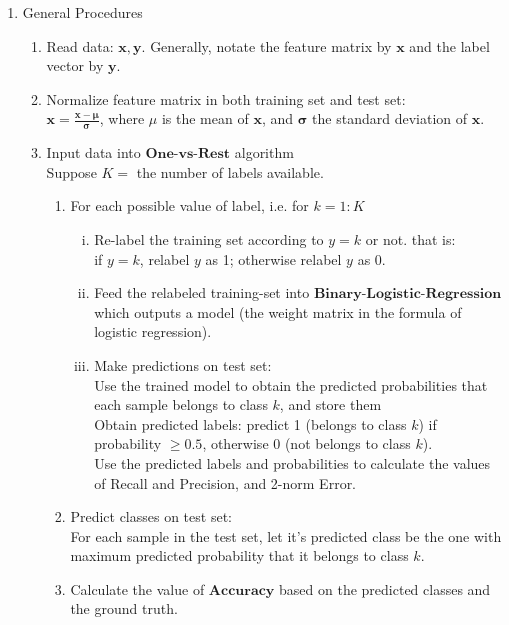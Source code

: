 \documentclass[a4paper,UTF8]{article}
\numberwithin{equation}{section}
\begin{document}
\begin{enumerate}[1.]

\item General Procedures

	\begin{enumerate}[(1)]
	\item 	Read data: $\mathbf{x, y}$. Generally, notate the feature matrix by $\mathbf{x}$  and the label vector by $\mathbf{y}$.
	\item Normalize feature matrix in both training set and test set: \\
	$\mathbf{x = \frac{x - \mu}{\sigma}}$, where $\mu$ is the mean of $\mathbf{x}$, and $\mathbf{\sigma}$ the standard deviation of $\mathbf{x}$.
	\item Input data into $\textbf{One-vs-Rest}$ algorithm\\
		Suppose $K = $ the number of labels available.
		\begin{enumerate}[Step 1.]
		\item For each possible value of label, i.e. for $k = 1 : K$
		 	\begin{enumerate}[(i)]
		 	\item Re-label the training set according to $y = k$ or not. that is: \\
		 	if $y = k$, relabel $y$ as 1; otherwise relabel $y$ as 0.
		 	\item Feed the relabeled training-set into $\textbf{Binary-Logistic-Regression}$ which outputs a model (the weight matrix in the formula of logistic regression).
		 	\item Make predictions on test set:\\
		 	Use the trained model to obtain the predicted probabilities that each sample belongs to class $k$, and store them \\
		 	Obtain predicted labels: predict 1 (belongs to class $k$) if probability $\geq 0.5$, otherwise 0 (not belongs to class $k$).\\
		 	Use the predicted labels and probabilities to calculate the values of Recall and Precision, and 2-norm Error.
		 	\end{enumerate}
	   \item Predict classes on test set: \\
	   For each sample in the test set, let it's predicted class be the one with maximum predicted probability that it belongs to class $k$.
	   \item Calculate the value of $\textbf{Accuracy}$ based on the predicted classes and the ground truth.
		\end{enumerate}
	\end{enumerate}
	

\end{enumerate}
\end{document}
